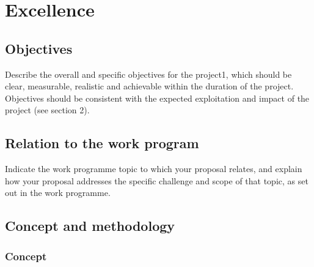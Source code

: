 \chapter{Excellence}



\section{Objectives}

\begin{todo}{}\color{red}
  Describe the overall and specific objectives for the project1, which should be clear, measurable, realistic and achievable within the duration of the project. Objectives should be consistent with the expected exploitation and impact of the project (see section 2).
\end{todo}



\section{Relation to the work program}

\begin{todo}{}\color{red}
  Indicate the work programme topic to which your proposal relates, and explain how your proposal addresses the specific challenge and scope of that topic, as set out in the work programme.
\end{todo}



\section{Concept and methodology}

\subsection{Concept}\label{concept}

